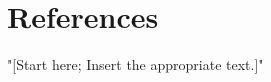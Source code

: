\newpage
\section{\protect\centering References}
\doublespacing
"[Start here; Insert the appropriate text.]"
